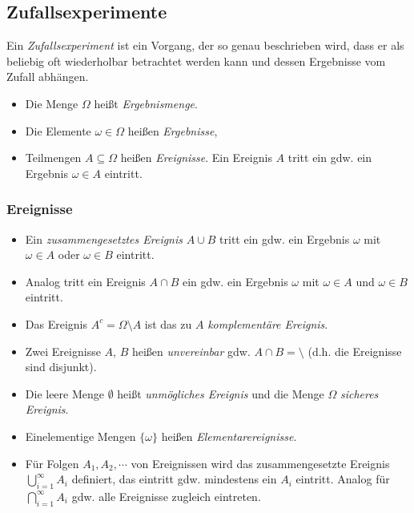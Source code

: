 	\subsection{Zufallsexperimente}
		Ein \textit{Zufallsexperiment} ist ein Vorgang, der so genau beschrieben wird, dass er als beliebig oft wiederholbar betrachtet werden kann und dessen Ergebnisse vom Zufall abhängen.

		\begin{itemize}
			\item Die Menge \(\Omega\) heißt \textit{Ergebnismenge}.
			\item Die Elemente \(\omega \in \Omega\) heißen \textit{Ergebnisse},
			\item Teilmengen \(A \subseteq \Omega\) heißen \textit{Ereignisse}. Ein Ereignis \(A\) tritt ein gdw. ein Ergebnis \( \omega \in A \) eintritt.
		\end{itemize}

		\subsubsection{Ereignisse}
			\begin{itemize}
				\item Ein \textit{zusammengesetztes Ereignis} \( A \cup B \) tritt ein gdw. ein Ergebnis \(\omega\) mit \(\omega \in A\) oder \(\omega \in B\) eintritt.
				\item Analog tritt ein Ereignis \( A \cap B \) ein gdw. ein Ergebnis \(\omega\) mit \(\omega \in A\) und \(\omega \in B\) eintritt.
				\item Das Ereignis \( A ^ c = \Omega \setminus A \) ist das zu \(A\) \textit{komplementäre Ereignis}.
				\item Zwei Ereignisse \(A\), \(B\) heißen \textit{unvereinbar} gdw. \( A \cap B = \setminus \) (d.h. die Ereignisse sind disjunkt).
				\item Die leere Menge \(\emptyset\) heißt \textit{unmögliches Ereignis} und die Menge \(\Omega\) \textit{sicheres Ereignis}.
				\item Einelementige Mengen \( \{ \omega \} \) heißen \textit{Elementarereignisse}.
				\item Für Folgen \( A_1, A_2, \cdots \) von Ereignissen wird das zusammengesetzte Ereignis \( \bigcup_{i = 1}^\infty A_i \) definiert, das eintritt gdw. mindestens ein \(A_i\) eintritt. Analog für \( \bigcap_{i = 1}^\infty A_i \) gdw. alle Ereignisse zugleich eintreten.
			\end{itemize}

